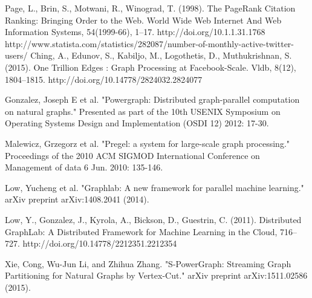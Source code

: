 \documentclass[12pt]{article}
\begin{document}
\begin{thebibliography}{1}

   Page, L., Brin, S., Motwani, R.,  Winograd, T. (1998). The PageRank Citation Ranking: Bringing Order to the Web. World Wide Web Internet And Web Information Systems, 54(1999-66), 1–17. http://doi.org/10.1.1.31.1768
   http://www.statista.com/statistics/282087/number-of-monthly-active-twitter-users/
   Ching, A., Edunov, S., Kabiljo, M., Logothetis, D.,  Muthukrishnan, S. (2015). One Trillion Edges : Graph Processing at Facebook-Scale. Vldb, 8(12), 1804–1815. http://doi.org/10.14778/2824032.2824077
  
   Gonzalez, Joseph E et al. "Powergraph: Distributed graph-parallel computation on natural graphs." Presented as part of the 10th USENIX Symposium on Operating Systems Design and Implementation (OSDI 12) 2012: 17-30.

    Malewicz, Grzegorz et al. "Pregel: a system for large-scale graph processing." Proceedings of the 2010 ACM SIGMOD International Conference on Management of data 6 Jun. 2010: 135-146.

   Low, Yucheng et al. "Graphlab: A new framework for parallel machine learning." arXiv preprint arXiv:1408.2041 (2014).
  
   Low, Y., Gonzalez, J., Kyrola, A., Bickson, D.,  Guestrin, C. (2011). Distributed GraphLab: A Distributed Framework for Machine Learning in the Cloud, 716–727. http://doi.org/10.14778/2212351.2212354
  
   Xie, Cong, Wu-Jun Li, and Zhihua Zhang. "S-PowerGraph: Streaming Graph Partitioning for Natural Graphs by Vertex-Cut." arXiv preprint arXiv:1511.02586 (2015).
  

\end{thebibliography}
\end{document}
